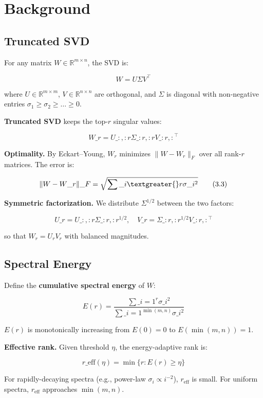 
\section{Background}

\subsection{Truncated SVD}

For any matrix $W \in \mathbb{R}^{m \times n}$, the SVD is:

\[
W = U \Sigma V^\top
\tag{3.1}
\]

where $U \in \mathbb{R}^{m \times m}$, $V \in \mathbb{R}^{n \times n}$ are 
orthogonal, and $\Sigma$ is diagonal with non-negative entries 
$\sigma_1 \geq \sigma_2 \geq \dots \geq 0$.

\textbf{Truncated SVD} keeps the top-$r$ singular values:

\[
W\_r = U\_{:, :r} \Sigma\_{:r, :r} V\_{:r, :}^\top
\tag{3.2}
\]

\textbf{Optimality.} By Eckart--Young, $W_r$ minimizes $\|W - W_r\|_F$ over all 
rank-$r$ matrices. The error is:

\[
\|W - W\_r\|\_F = \sqrt{\sum\_{i \textgreater{} r} \sigma\_i^2}
\tag{3.3}
\]

\textbf{Symmetric factorization.} We distribute $\Sigma^{1/2}$ between the two 
factors:

\[
U\_r = U\_{:, :r} \Sigma\_{:r, :r}^{1/2}, \quad
V\_r = \Sigma\_{:r, :r}^{1/2} V\_{:r, :}^\top
\tag{3.4}
\]

so that $W_r = U_r V_r$ with balanced magnitudes.

\subsection{Spectral Energy}

Define the \textbf{cumulative spectral energy} of $W$:

\[
E(r) = \frac{\sum\_{i=1}^{r} \sigma\_i^2}{\sum\_{i=1}^{\min(m, n)} \sigma\_i^2}
\tag{3.5}
\]

$E(r)$ is monotonically increasing from $E(0) = 0$ to $E(\min(m, n)) = 1$.

\textbf{Effective rank.} Given threshold $\eta$, the energy-adaptive rank is:

\[
r\_\text{eff}(\eta) = \min\{r : E(r) \geq \eta\}
\tag{3.6}
\]

For rapidly-decaying spectra (e.g., power-law $\sigma_i \propto i^{-2}$), 
$r_\text{eff}$ is small. For uniform spectra, $r_\text{eff}$ approaches 
$\min(m, n)$.

